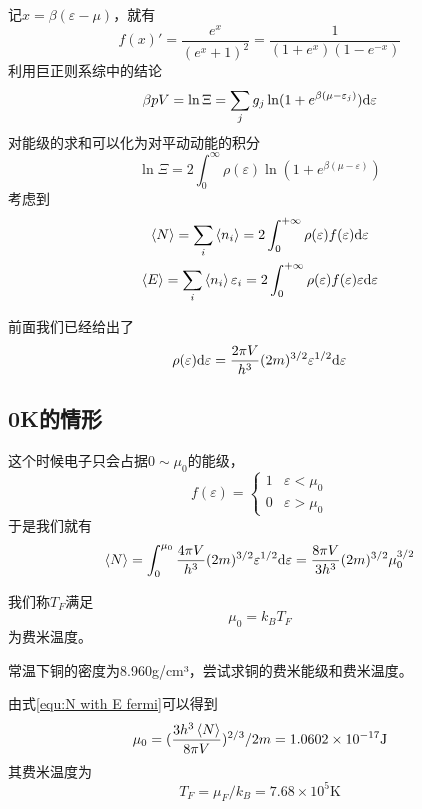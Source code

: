 记$x=\beta(\varepsilon-\mu)$，就有\begin{equation}
    f(x)'=\frac{e^x}{(e^x+1)^2}=\frac{1}{(1+e^x)(1-e^{-x})}
\end{equation}
利用巨正则系综中的结论\begin{equation}
    \beta p V =\ln \Xi =\sum_j g_j \ln (1+ e^{\beta (\mu-\varepsilon_j)}) \mathrm{d} \varepsilon
\end{equation}
对能级的求和可以化为对平动动能的积分\begin{equation}
    \ln \Xi =2 \int_0^\infty \rho(\varepsilon) \ln (1+e^{\beta (\mu-\varepsilon) })
\end{equation}
考虑到\begin{gather}
    \braket{N} = \sum_i \braket{n_i} =2 \int_{0}^{+\infty} \rho(\varepsilon) f(\varepsilon) \mathrm{d}\varepsilon\\
    \braket{E} =\sum_i \braket{n_i} \varepsilon_i =2\int_{0}^{+\infty} \rho(\varepsilon)f(\varepsilon) \varepsilon\mathrm{d}\varepsilon
\end{gather}

前面我们已经给出了\begin{equation}
    \rho(\varepsilon) \mathrm{d}\varepsilon =\frac{2\pi V}{h^3} (2m)^{3/2} \varepsilon^{1/2}\mathrm{d} \varepsilon
\end{equation}
\subsection{0K的情形} %
\label{sub:0K的情形}
这个时候电子只会占据$0\sim \mu_0$的能级，\begin{equation}
    f(\varepsilon)=\begin{cases}
        1 & \varepsilon <\mu_0\\
        0 & \varepsilon>\mu_0
    \end{cases}
\end{equation}
于是我们就有\begin{equation}
    \braket{N}=\int_0^{\mu_0} \frac{4\pi V }{h^3} (2m)^{3/2} \varepsilon^{1/2}\mathrm{d} \varepsilon =\frac{8\pi V}{3h^3} (2m)^{3/2} \mu_0^{3/2} \label{equ:N with E fermi}
\end{equation}
\begin{definition}
    我们称$T_F$满足\begin{equation}
        \mu_0 =k_B T_F
    \end{equation}
    为费米温度。
\end{definition}

\begin{example}
    常温下铜的密度为8.960g/cm³，尝试求铜的费米能级和费米温度。
\end{example}
\begin{solution}
    由式\eqref{equ:N with E fermi}可以得到\begin{equation}
        \mu_0 =(\frac{3h^3 \braket{N}}{8\pi V})^{2/3}/2m =1.0602\times 10^{-17} \mathrm{J}
    \end{equation}
    其费米温度为\begin{equation}
        T_F =\mu_F/k_B=7.68\times 10^5 \mathrm{K}
    \end{equation}
\end{solution}

